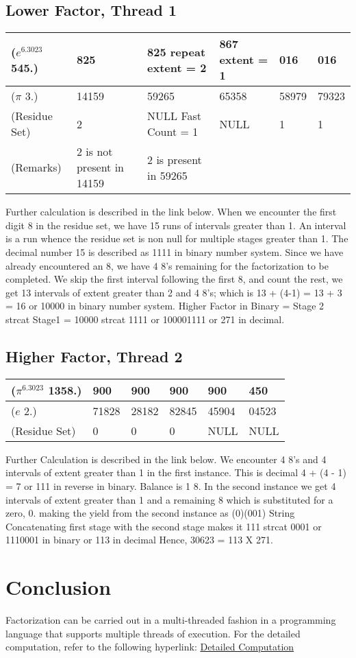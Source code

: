 \documentclass{article}
\begin{document}
\subsection{Lower Factor, Thread 1}
\begin{tabular}{||l|l|l|l|l|l||} \hline\hline
	($e^{6.3023}$ 545.) & 825 & 825 repeat extent = 2 & 867 extent = 1 & 016 & 016 \\ \hline
	($\pi$ 3.) & 14159 & 59265 & 65358 & 58979 & 79323 \\ \hline
	(Residue Set) & 2 & NULL Fast Count = 1 & NULL & 1 & 1 \\ \hline
	(Remarks) & 2 is not present in 14159 & 2 is present in 59265 & & & \\ \hline\hline
\end{tabular}
Further calculation is described in the link below. When we encounter the first digit 8 in the residue set, we have 
15 runs of intervals greater than 1. An interval is a run whence the residue set is non null for multiple stages greater than 1.
The decimal number 15 is described as 1111 in binary number system.
Since we have already encountered an 8, we have 4 8's remaining for the factorization to be completed.
We skip the first interval following the first 8, and count the rest, we get 13 intervals of extent greater than 2 and 4 8's; which is 13 + (4-1) = 13 + 3 = 16 or 10000 in binary number system.
Higher Factor in Binary  = Stage 2 strcat Stage1 = 10000 strcat 1111 or 100001111 or 271 in decimal.

\subsection{Higher Factor, Thread 2}
\begin{tabular}{||l|l|l|l|l|l||} \hline\hline
	($\pi^{6.3023}$ 1358.) & 900 & 900 & 900 & 900 & 450 \\ \hline
	($e$ 2.) & 71828 & 28182 & 82845 & 45904 & 04523 \\ \hline
	(Residue Set) & 0 & 0 & 0 & NULL & NULL \\ \hline\hline
\end{tabular}
Further Calculation is described in the link below. We encounter 4 8's and 4 intervals of extent greater than 1 in the first instance.
This is decimal 4 + (4 - 1) = 7 or 111 in reverse in binary.
Balance is 1 8.
In the second instance we get 4 intervals of extent greater than 1 and a remaining 8 which is substituted for a zero, 0. making the yield from the second instance as (0)(001)
String Concatenating first stage with the second stage makes it 111 strcat 0001 or 1110001 in binary or 113 in decimal
Hence, 30623 = 113 X 271.

\section{Conclusion}
Factorization can be carried out in a multi-threaded fashion in a programming language that supports multiple threads of execution.
For the detailed computation, refer to the following hyperlink: \href{https://www.dropbox.com/s/8hrsvfw2y9r5f6f/final%20manuscript%202003%2C2022.pdf?dl=0}{Detailed Computation}
\end{document}
